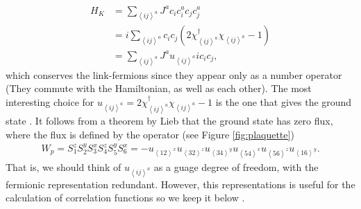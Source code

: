 \documentclass[aps,pra,preprint,groupedaddress]{revtex4-1}
\newcommand{\1}{\mathds{1}}
\begin{document}
\begin{align} %
H_K &= \sum_{\left<ij\right>^a} J^a c_i c_i^a c_j c_j^a \nonumber \\
&= i\sum_{\left<ij\right>^a} c_i c_j \left( 2 \chi_{\left<ij\right>^a}^\dagger \chi_{\left<ij\right>^a } - 1  \right) \nonumber\\
&= \sum_{\left<ij\right>^a} J^a u_{\left<ij\right>^a} i c_i c_j ,     \label{Kitaev2}
\end{align}
which conserves the link-fermions since they appear only as a number operator (They commute with the Hamiltonian, as well as each other). The most interesting choice for $u_{\left<ij\right>^a} = 2 \chi_{\left<ij\right>^a}^\dagger \chi_{\left<ij\right>^a } - 1 $ is the one that gives the ground state \cite{Kitaev}. It follows from a theorem by Lieb \cite{Lieb,Kitaev} that the ground state has zero flux, where the flux is defined by the operator (see Figure \ref{fig:plaquette})
\begin{align}
W_p = S_1^z S_2^y S_3^x S_4^z S_5^y S_6^x = - {u}_{\left<12\right>^x} {u}_{\left<32\right>^z} {u}_{\left<34\right>^y} {u}_{\left<54\right>^x} {u}_{\left<56\right>^z}{u}_{\left<16\right>^y}.  
\end{align}
That is, we should think of $u_{\left<ij\right>^a}$ as a guage degree of freedom, with the fermionic representation redundant. However, this representations is useful for the calculation of correlation functions so we keep it below \cite{Baskaran}.
\end{document}
